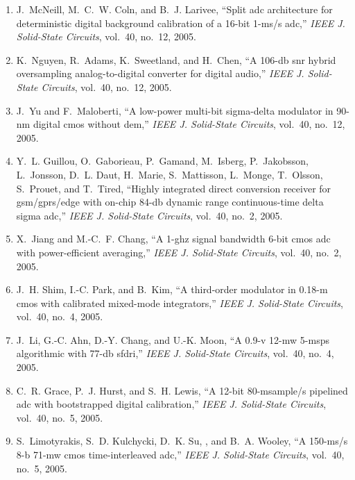 \begin{enumerate}
\item
J.~McNeill, M.~C.~W. Coln, and B.~J. Larivee, ``Split adc architecture for
  deterministic digital background calibration of a 16-bit 1-ms/s adc,''
  \emph{{IEEE} J. Solid-State Circuits}, vol.~40, no.~12, 2005.

\item
K.~Nguyen, R.~Adams, K.~Sweetland, and H.~Chen, ``A 106-db snr hybrid
  oversampling analog-to-digital converter for digital audio,'' \emph{{IEEE} J.
  Solid-State Circuits}, vol.~40, no.~12, 2005.

\item
J.~Yu and F.~Maloberti, ``A low-power multi-bit sigma-delta modulator in 90-nm
  digital cmos without dem,'' \emph{{IEEE} J. Solid-State Circuits}, vol.~40,
  no.~12, 2005.

\item
Y.~L. Guillou, O.~Gaborieau, P.~Gamand, M.~Isberg, P.~Jakobsson, L.~Jonsson,
  D.~L. Daut, H.~Marie, S.~Mattisson, L.~Monge, T.~Olsson, S.~Prouet, and
  T.~Tired, ``Highly integrated direct conversion receiver for gsm/gprs/edge
  with on-chip 84-db dynamic range continuous-time delta sigma adc,''
  \emph{{IEEE} J. Solid-State Circuits}, vol.~40, no.~2, 2005.

\item
X.~Jiang and M.-C.~F. Chang, ``A 1-ghz signal bandwidth 6-bit cmos adc with
  power-efficient averaging,'' \emph{{IEEE} J. Solid-State Circuits}, vol.~40,
  no.~2, 2005.

\item
J.~H. Shim, I.-C. Park, and B.~Kim, ``A third-order modulator in 0.18-m cmos
  with calibrated mixed-mode integrators,'' \emph{{IEEE} J. Solid-State
  Circuits}, vol.~40, no.~4, 2005.

\item
J.~Li, G.-C. Ahn, D.-Y. Chang, and U.-K. Moon, ``A 0.9-v 12-mw 5-msps
  algorithmic with 77-db sfdri,'' \emph{{IEEE} J. Solid-State Circuits},
  vol.~40, no.~4, 2005.

\item
C.~R. Grace, P.~J. Hurst, and S.~H. Lewis, ``A 12-bit 80-msample/s pipelined
  adc with bootstrapped digital calibration,'' \emph{{IEEE} J. Solid-State
  Circuits}, vol.~40, no.~5, 2005.

\item
S.~Limotyrakis, S.~D. Kulchycki, D.~K. Su, , and B.~A. Wooley, ``A 150-ms/s 8-b
  71-mw cmos time-interleaved adc,'' \emph{{IEEE} J. Solid-State Circuits},
  vol.~40, no.~5, 2005.


\end{enumerate}
